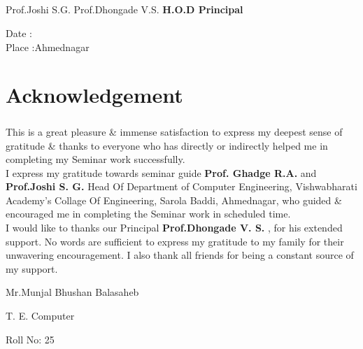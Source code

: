 \documentclass[12pt]{report}
\begin{document}
\begin{center}
\begin{flushleft}
{\paragraph{}
\vspace{0.2in}            
\hspace{0.5cm} Prof.Joshi S.G. \hspace{5.0cm} Prof.Dhongade V.S.   \textbf{\hspace{5.5cm} H.O.D            \hspace{7.0cm} Principal} }

\end{flushleft}
\vspace{0.15in}
\begin{flushleft}
Date :\\
\vspace{0.1in}
Place :Ahmednagar\\
\end{flushleft}
\end{center}

\newpage

\chapter* { \centering Acknowledgement}\thisfancypage{\setlength{\fboxsep}{10pt}\doublebox}{}
\vspace{1cm}
\par
\onehalfspacing
\paragraph{}
This is a great pleasure \& immense satisfaction to express my deepest sense of gratitude
\& thanks to everyone who has directly or indirectly helped me in completing my Seminar
work successfully.\\

I express my gratitude towards seminar guide  {\bfseries Prof. Ghadge R.A.} and {\bfseries Prof.Joshi S. G.} Head Of Department of Computer
Engineering, Vishwabharati Academy's Collage Of Engineering, Sarola Baddi, Ahmednagar, who guided \& encouraged me in completing the Seminar work in scheduled time.\\

I would like to thanks our Principal {\bfseries Prof.Dhongade V. S. }, for his extended support.
No words are sufficient to express my gratitude to my family for their unwavering
encouragement. I also thank all friends for being a constant source of my support.\\
\vspace{3cm}
\begin{flushright}{Mr.Munjal Bhushan Balasaheb}\end{flushright}
\begin{flushright}{T. E. Computer}\end{flushright}
\begin{flushright}{Roll No: 25}\end{flushright}
\end{document}
